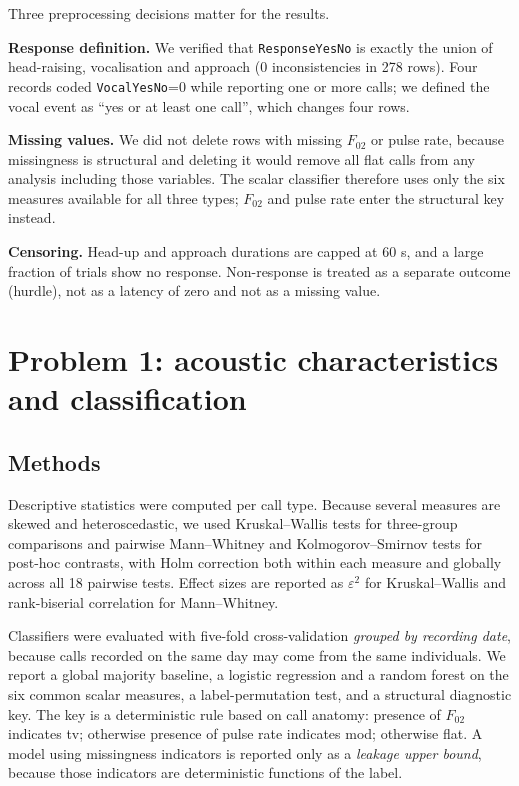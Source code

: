 \documentclass{apmcmthesis}
\begin{document}
Three preprocessing decisions matter for the results.

\textbf{Response definition.} We verified that \texttt{ResponseYesNo} is exactly the union of
head-raising, vocalisation and approach (0 inconsistencies in 278 rows). Four records coded
\texttt{VocalYesNo}=0 while reporting one or more calls; we defined the vocal event as
``yes or at least one call'', which changes four rows.

\textbf{Missing values.} We did not delete rows with missing $F_{02}$ or pulse rate, because
missingness is structural and deleting it would remove all flat calls from any analysis
including those variables. The scalar classifier therefore uses only the six measures available
for all three types; $F_{02}$ and pulse rate enter the structural key instead.

\textbf{Censoring.} Head-up and approach durations are capped at 60 s, and a large fraction of
trials show no response. Non-response is treated as a separate outcome (hurdle), not as a
latency of zero and not as a missing value.

\section{Problem 1: acoustic characteristics and classification}

\subsection{Methods}
Descriptive statistics were computed per call type. Because several measures are skewed and
heteroscedastic, we used Kruskal--Wallis tests for three-group comparisons and pairwise
Mann--Whitney and Kolmogorov--Smirnov tests for post-hoc contrasts, with Holm correction both
within each measure and globally across all 18 pairwise tests. Effect sizes are reported as
$\varepsilon^2$ for Kruskal--Wallis and rank-biserial correlation for Mann--Whitney.

Classifiers were evaluated with five-fold cross-validation \emph{grouped by recording date},
because calls recorded on the same day may come from the same individuals. We report a global
majority baseline, a logistic regression and a random forest on the six common scalar measures,
a label-permutation test, and a structural diagnostic key. The key is a deterministic rule
based on call anatomy: presence of $F_{02}$ indicates tv; otherwise presence of pulse rate
indicates mod; otherwise flat. A model using missingness indicators is reported only as a
\emph{leakage upper bound}, because those indicators are deterministic functions of the label.
\end{document}
